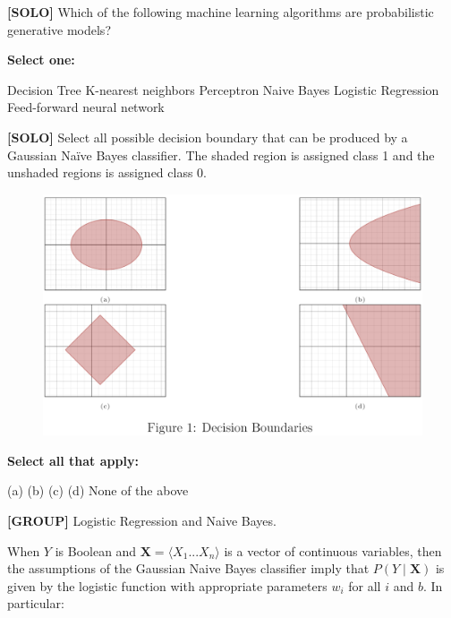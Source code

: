 \documentclass[11pt,addpoints,answers]{exam}
\newcommand{\Xv}{\mathbf{X}}
\newcommand{\solo}{\textbf{[SOLO]} }
\newcommand{\group}{\textbf{[GROUP]} }
\begin{document}
\begin{questions}
    
    \question[3] \solo Which of the following machine learning algorithms are probabilistic generative models?

    \textbf{Select one:}
    \begin{checkboxes}
        \choice Decision Tree
        \choice K-nearest neighbors
        \choice Perceptron
        \CorrectChoice Naive Bayes
        \choice Logistic Regression
        \choice Feed-forward neural network
    \end{checkboxes}
    

    \question[2]\solo Select all possible decision boundary that can be produced by a Gaussian Naïve Bayes classifier. The shaded region is assigned class 1 and the unshaded regions is assigned class 0.
    \begin{figure}[H]
        \centering
        \includegraphics[scale=0.45]{figs/GNB_decision_boundary.png}
    \end{figure}
    
    \textbf{Select all that apply:}
    {\checkboxchar{$\Box$} \checkedchar{$\blacksquare$}
    \begin{checkboxes}
        \CorrectChoice (a)
        \CorrectChoice (b)
        \choice (c)
        \CorrectChoice (d)
        \choice None of the above
    \end{checkboxes}
    }
    
    

    \question[4]\group Logistic Regression and Naive Bayes. 

When $Y$ is Boolean and $\Xv = \langle{X_{1}...X_{n}}\rangle$ is a vector of continuous variables, then the assumptions of the Gaussian Naive Bayes classifier imply that $P(Y \mid \Xv)$ is given by the logistic function with
appropriate parameters $w_i$ for all $i$ and $b$. In particular:


\end{questions}
\end{document}
